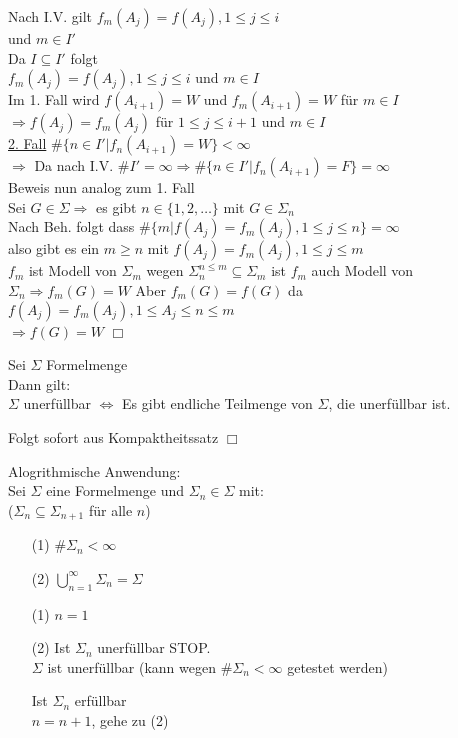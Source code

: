 Nach I.V. gilt $f_m(A_j) = f(A_j), 1 \leq j \leq i$\\
und $m \in I'$\\
Da $I \subseteq I'$ folgt\\
$f_m(A_j) = f(A_j), 1 \leq j \leq i$ und $m \in I$\\
Im 1. Fall wird $f(A_{i+1})=W$ und $f_m(A_{i+1})=W$ für $m \in I$\\
$\Rightarrow f(A_j) = f_m(A_j)$ für $1 \leq j \leq i+1$ und $m \in I$\\
\underline{2. Fall} $\# \{ n \in I' | f_n(A_{i+1})=W \} < \infty$\\
$\Rightarrow$ Da nach I.V. $\# I' = \infty \Rightarrow \# \{n \in I' | f_n(A_{i+1}) = F \} = \infty$\\

Beweis nun analog zum 1. Fall\\
Sei $G \in \Sigma \Rightarrow$ es gibt $n \in \{1, 2, …\}$ mit $G \in \Sigma_n$\\
Nach Beh. folgt dass $\# \{ m | f(A_j) = f_m(A_j), 1 \leq j \leq n \} = \infty$\\
also gibt es ein $m \geq n$ mit $f(A_j) = f_m(A_j), 1 \leq j \leq m$\\
$f_m$ ist Modell von $\Sigma_m$ wegen $\Sigma_n^{n \leq m} \subseteq \Sigma_m$ ist $f_m$ auch Modell von $\Sigma_n \Rightarrow f_m(G) = W$
Aber $f_m(G) = f(G) $ da $f(A_j) = f_m(A_j), 1 \leq A_j \leq n \leq m$\\
$\Rightarrow f(G) = W$ $\Box$

Sei $\Sigma$ Formelmenge\\
Dann gilt:\\
$\Sigma$ unerfüllbar $\Leftrightarrow$ Es gibt endliche Teilmenge von $\Sigma$, die unerfüllbar ist.

\beweis{} Folgt sofort aus Kompaktheitssatz $\Box$

Alogrithmische Anwendung:\\
Sei $\Sigma$ eine Formelmenge und $\Sigma_n \in \Sigma$ mit:\\
($\Sigma_n \subseteq \Sigma_{n+1}$ für alle $n$)
\begin{enumerate}
\item[(1)] $\# \Sigma_n < \infty$

\item[(2)] $\bigcup_{n=1}^{\infty} \Sigma_n = \Sigma$
\end{enumerate}

\begin{enumerate}
\item[(1)] $n=1$

\item[(2)] Ist $\Sigma_n$ unerfüllbar STOP.\\
$\Sigma$ ist unerfüllbar \hspace{1cm} (kann wegen $\# \Sigma_n < \infty$ getestet werden)

Ist $\Sigma_n$ erfüllbar\\
$n=n+1$, gehe zu (2)
\end{enumerate}

